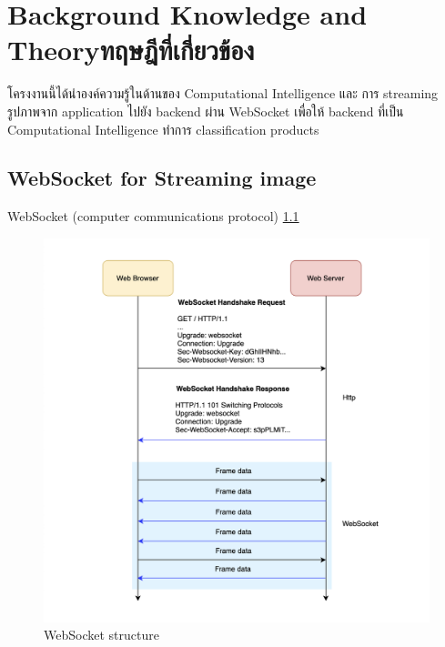 \chapter{\ifenglish Background Knowledge and Theory\else ทฤษฎีที่เกี่ยวข้อง\fi}

\par โครงงานนี้ได้นำองค์ความรู้ในด้านของ Computational Intelligence และ การ streaming
รูปภาพจาก application ไปยัง backend ผ่าน WebSocket   เพื่อให้ backend
ที่เป็น Computational Intelligence ทำการ classification products


\section{WebSocket for Streaming image \cite{WebSocket}}
\par WebSocket (computer communications protocol)
\ref{fig:WebSocket structure}


\begin{figure}[h]
  \begin{center}

    \includegraphics[scale=0.5]{pic/websocket-works-2.png}
  \end{center}

  \caption[WebSocket structure]{WebSocket structure}
  \label{fig:WebSocket structure}
\end{figure}



